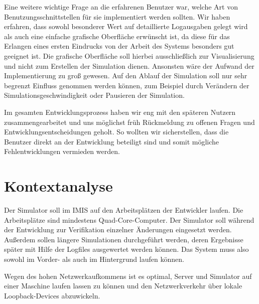 Eine weitere wichtige Frage an die erfahrenen Benutzer war, welche Art von Benutzungsschnittstellen für sie implementiert werden sollten. Wir haben erfahren, dass sowohl besonderer Wert auf detaillierte Logausgaben gelegt wird als auch eine einfache grafische Oberfläche erwünscht ist, da diese für das Erlangen eines ersten Eindrucks von der Arbeit des Systems besonders gut geeignet ist. Die grafische Oberfläche soll hierbei ausschließlich zur Visualisierung und nicht zum Erstellen der Simulation dienen. Ansonsten  wäre der Aufwand der Implementierung zu groß gewesen. Auf den Ablauf der Simulation soll nur sehr begrenzt Einfluss genommen werden können, zum Beispiel durch Verändern der Simulationsgeschwindigkeit oder Pausieren der Simulation.

Im gesamten Entwicklungsprozess haben wir eng mit den späteren Nutzern zusammengearbeitet und uns möglichst früh Rückmeldung zu offenen Fragen und Entwicklungsentscheidungen geholt. So wollten wir sicherstellen, dass die Benutzer direkt an der Entwicklung beteiligt sind und somit mögliche Fehlentwicklungen vermieden werden.


\section{Kontextanalyse}\label{sec:context_ana}
Der Simulator soll im IMIS auf den Arbeitsplätzen der Entwickler laufen. Die Arbeitsplätze sind mindestens Quad-Core-Computer. Der Simulator soll während der Entwicklung zur Verifikation einzelner Änderungen eingesetzt werden. Außerdem sollen längere Simulationen durchgeführt werden, deren Ergebnisse später mit Hilfe der Logfiles ausgewertet werden können. Das System muss also sowohl im Vorder- als auch im Hintergrund laufen können.

Wegen des hohen Netzwerkaufkommens ist es optimal, Server und Simulator auf einer Maschine laufen lassen zu können und den Netzwerkverkehr über lokale Loopback-Devices abzuwickeln.
